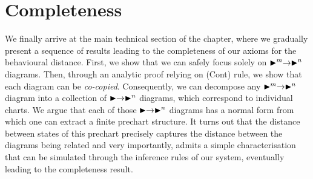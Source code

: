 \section{Completeness}
\label{sec:completeness}
We finally arrive at the main technical section of the chapter, where we gradually present a sequence of results leading to the completeness of our axioms for the behavioural distance. First, we show that we can safely focus solely on $\blacktriangleright^m \to \blacktriangleright^n$ diagrams. Then, through an analytic proof relying on \textsf{(Cont)} rule, we show that each diagram can be \emph{co-copied}. Consequently, we can decompose any $\blacktriangleright^m \to \blacktriangleright^n$ diagram into a collection of $\blacktriangleright \to \blacktriangleright^n$ diagrams, which correspond to individual charts. We argue that each of those $\blacktriangleright \to \blacktriangleright^n$ diagrams has a normal form from which one can extract a finite prechart structure. It turns out that the distance between states of this prechart precisely captures the distance between the diagrams being related and very importantly, admits a simple characterisation that can be simulated through the inference rules of our system, eventually leading to the completeness result.
